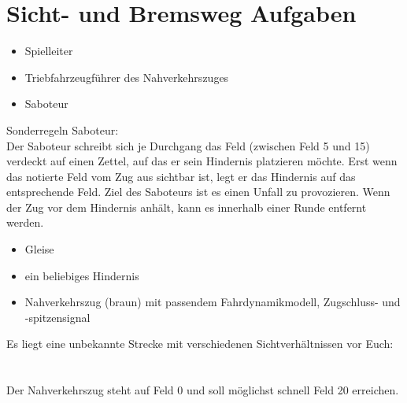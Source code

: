 

\section{Sicht- und Bremsweg Aufgaben}

  \roles
    \begin{itemize}
      \item Spielleiter
      \item Triebfahrzeugführer des Nahverkehrszuges
      \item Saboteur
    \end{itemize}
    Sonderregeln Saboteur:\\
    Der Saboteur schreibt sich je Durchgang das Feld (zwischen Feld 5 und 15) verdeckt auf einen Zettel, auf das er sein Hindernis platzieren möchte. Erst wenn das notierte Feld vom Zug aus sichtbar ist, legt er das Hindernis auf das entsprechende Feld. Ziel des Saboteurs ist es einen Unfall zu provozieren. Wenn der Zug vor dem Hindernis anhält, kann es innerhalb einer Runde entfernt werden.


  \material
    \begin{itemize}
      \item Gleise
      \item ein beliebiges Hindernis
      \item Nahverkehrszug (braun) mit passendem Fahrdynamikmodell, Zugschluss- und -spitzensignal
    \end{itemize}

  \setup
    Es liegt eine unbekannte Strecke mit verschiedenen Sichtverhältnissen vor Euch:\\
    \\ \\
Der Nahverkehrszug steht auf Feld 0 und soll möglichst schnell Feld 20 erreichen.

\newpage

